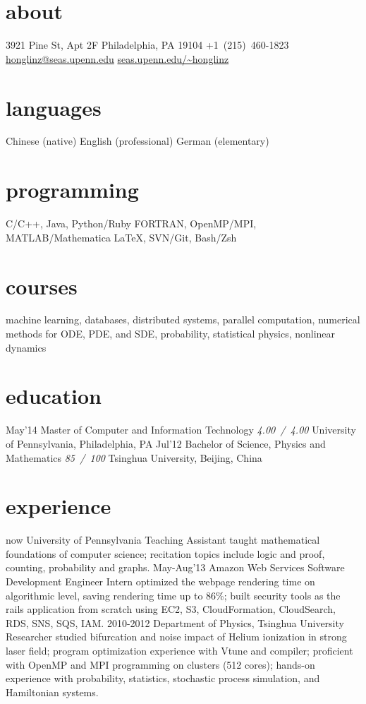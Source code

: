 \documentclass[]{friggeri-cv}
\begin{document}
{}

\begin{aside}
  \section{about}
  3921 Pine St, Apt 2F
  Philadelphia, PA
  19104
  +1~(215)~460-1823
  \href{mailto:honglinz@seas.upenn.edu}{honglinz@seas.upenn.edu}
  \href{http://www.seas.upenn.edu/~honglinz}{seas.upenn.edu/\textasciitilde{}honglinz}
  \section{languages}
  Chinese (native)
  English (professional)
  German (elementary)
  \section{programming}
  C/C++, Java, Python/Ruby
  FORTRAN, OpenMP/MPI, MATLAB/Mathematica
  \LaTeX, SVN/Git, Bash/Zsh
\end{aside}

\section{courses}
machine learning, databases, distributed systems, parallel computation, numerical methods for ODE, PDE, and SDE, probability, statistical physics, nonlinear dynamics
\section{education}

\begin{entrylist}
  \entry
    {May'14}
    {Master of Computer and Information Technology}
    {\emph{4.00~/~4.00}}
    {University of Pennsylvania, Philadelphia, PA}
  \entry
    {Jul'12}
    {Bachelor of Science, Physics and Mathematics}
    {\emph{85~/~100}}
    {Tsinghua University, Beijing, China}
\end{entrylist}
\section{experience}
\begin{entrylist}
  \entry
  {now}
  {University of Pennsylvania}
  {Teaching Assistant}
  {taught mathematical foundations of computer science; recitation topics include logic and proof, counting, probability and graphs.}
  \entry
  {May-Aug'13}
  {Amazon Web Services}
  {Software Development Engineer Intern}
  {optimized the webpage rendering time on algorithmic level, saving rendering time up to 86\%; built security tools as the rails application from scratch using EC2, S3, CloudFormation, CloudSearch, RDS, SNS, SQS, IAM.}
  \entry
  {2010-2012}
  {Department of Physics, Tsinghua University}
  {Researcher}
  {studied bifurcation and noise impact of Helium ionization in strong laser field; program optimization experience with Vtune and compiler; proficient with OpenMP and MPI programming on clusters (512 cores); hands-on experience with probability, statistics, stochastic process simulation, and Hamiltonian systems.}
\end{entrylist}
\end{document}
